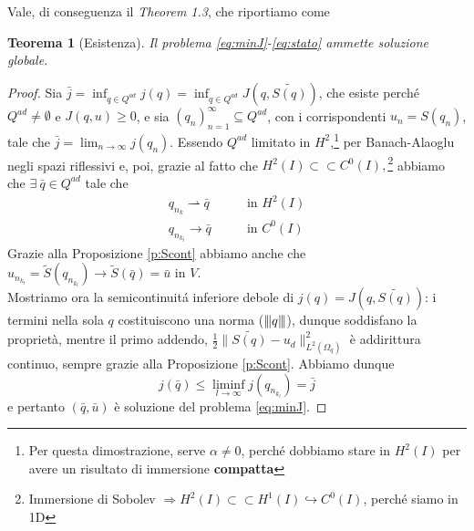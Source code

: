 \documentclass[a4paper,11pt]{article}
\newcommand{\vertiii}[1]{{\left\vert\kern-0.25ex\left\vert\kern-0.25ex\left\vert #1 
    \right\vert\kern-0.25ex\right\vert\kern-0.25ex\right\vert}}
\newcommand{\Q}{Q^{ad}}
\newcommand{\weak}{\rightharpoonup}
\newtheorem{teor}{Teorema}
\theoremstyle{remark}
\begin{document}
Vale, di conseguenza il \emph{Theorem 1.3}, che riportiamo come
\begin{teor}[Esistenza]
 Il problema \eqref{eq:minJ}-\eqref{eq:stato} ammette soluzione globale.
\end{teor}
\begin{proof}
 Sia $\bar{j}=\inf_{q\in\Q}j(q)=\inf_{q\in\Q}J(q,\tilde{S(q)})$, che esiste perch\'e $\Q\neq\emptyset$ e $J(q,u)\geq0$, e sia $(q_n)_{n=1}^\infty \subseteq Q^{ad}$, con i corrispondenti $u_n=S(q_n)$, tale che $\bar{j}=\lim_{n\to\infty}j(q_n)$. Essendo $Q^{ad}$ limitato in $H^2$,\footnote{Per questa dimostrazione, serve $\alpha\neq0$, perch\'e dobbiamo stare in $H^2(I)$ per avere un risultato di immersione \textbf{compatta}} per Banach-Alaoglu negli spazi riflessivi e, poi, grazie al fatto che $H^2(I)\subset\subset C^0(I),$\footnote{Immersione di Sobolev $\Rightarrow H^2(I)\subset\subset H^1(I)\hookrightarrow C^0(I)$, perch\'e siamo in 1D} abbiamo che $\exists\ \bar{q}\in \Q$ tale che
\begin{equation*}
\begin{aligned}
 q_{n_k} \weak \bar{q}\qquad &\text{in } H^2(I)\\
 q_{n_{k_l}} \rightarrow \bar{q}\qquad &\text{in } C^0(I)
\end{aligned}
\end{equation*}
Grazie alla Proposizione \ref{p:Scont} abbiamo anche che $u_{n_{k_l}}=\tilde{S}(q_{n_{k_l}}) \rightarrow \tilde{S}(\bar{q})=\bar{u}\text{  in } V$.\\
Mostriamo ora la semicontinuit\'a inferiore debole di $j(q)=J(q,\tilde{S(q)})$: i termini nella sola $q$ costituiscono una norma ($\vertiii{q}$), dunque soddisfano la propriet\`a, mentre il primo addendo, $\frac{1}{2}\|\tilde{S(q)}-u_d\|^2_{L^2(\Omega_q)}$ \`e addirittura continuo, sempre grazie alla Proposizione \ref{p:Scont}.
Abbiamo dunque $$j(\bar{q})\leq\liminf_{l \to \infty} j(q_{n_{k_l}})=\bar{j}$$
e pertanto $(\bar{q},\bar{u})$ \`e soluzione del problema \eqref{eq:minJ}.
\end{proof}
\end{document}
